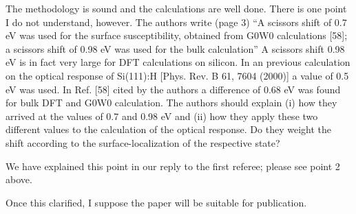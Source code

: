 \documentclass[aps,prb,10pt,endfloats]{revtex4-1}
\begin{document}
The methodology is sound and the calculations are well done. There is one point
I do not understand, however. The authors write (page 3) ``A scissors shift of
0.7 eV was used for the surface susceptibility, obtained from G0W0 calculations
[58]; a scissors shift of 0.98 eV was used for the bulk calculation'' A scissors
shift 0.98 eV is in fact very large for DFT calculations on silicon. In an
previous calculation on the optical response of Si(111):H [Phys. Rev. B 61, 7604
(2000)] a value of 0.5 eV was used. In Ref. [58] cited by the authors a
difference of 0.68 eV was found for bulk DFT and G0W0 calculation. The authors
should explain (i) how they arrived at the values of 0.7 and 0.98 eV and (ii)
how they apply these two different values to the calculation of the optical
response. Do they weight the shift according to the surface-localization of the
respective state?
\begin{shaded*}
We have explained this point in our reply to the first referee; please see point
2 above.
\end{shaded*}

Once this clarified, I suppose the paper will be suitable for publication.
\end{document}
